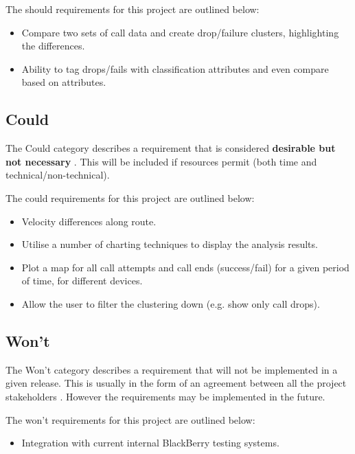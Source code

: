 The should requirements for this project are outlined below:
\begin{itemize}
  \item Compare two sets of call data and create drop/failure clusters, 
        highlighting the differences. 
  \item Ability to tag drops/fails with classification attributes and even 
        compare based on attributes.
\end{itemize}


\subsection{Could}
\label{sec:could}
The Could category describes a requirement that is considered {\bfseries 
desirable but not necessary} \citep{brennan09}. This will be included if 
resources permit (both time and technical/non-technical). 

The could requirements for this project are outlined below:
\begin{itemize}
  \item Velocity differences along route.
  \item Utilise a number of charting techniques to display the analysis 
        results.
  \item Plot a map for all call attempts and call ends (success/fail) for a 
        given period of time, for different devices.
  \item Allow the user to filter the clustering down (e.g. show only call 
        drops).
\end{itemize}


\subsection{Won't}
The Won't category describes a requirement that will not be implemented in a 
given release. This is usually in the form of an agreement between all the 
project stakeholders \citep{brennan09}. However the requirements may be 
implemented in the future. 

The won't requirements for this project are outlined below:
\begin{itemize}
  \item Integration with current internal BlackBerry testing systems.
\end{itemize}
